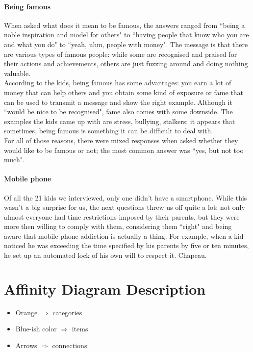 \documentclass[12pt]{scrartcl}
\begin{document}
		\paragraph{Being famous} When asked what does it mean to be famous, the answers ranged from ``being a noble inspiration and model for others" to ``having people that know who you are and what you do" to ``yeah, uhm, people with money". The message is that there are various types of famous people: while some are recognised and praised for their actions and achievements, others are just fuzzing around and doing nothing valuable.\\
		According to the kids, being famous has some advantages: you earn a lot of money that can help others and you obtain some kind of exposure or fame that can be used to transmit a message and show the right example. Although it ``would be nice to be recognised", fame also comes with some downside. The examples the kids came up with are stress, bullying, stalkers: it appears that sometimes, being famous is something it can be difficult to deal with.\\
		For all of those reasons, there were mixed responses when asked whether they would like to be famous or not; the most common answer was ``yes, but not too much".
		
		\paragraph{Mobile phone} Of all the 21 kids we interviewed, only one didn't have a smartphone. While this wasn't a big surprise for us, the next questions threw us off quite a lot: not only almost everyone had time restrictions imposed by their parents, but they were more then willing to comply with them, considering them ``right" and being aware that mobile phone addiction is actually a thing. For example, when a kid noticed he was exceeding the time specified by his parents by five or ten minutes, he set up an automated lock of his own will to respect it. Chapeau.
		

\section*{Affinity Diagram Description}
	\begin{itemize}
		\item Orange $\Rightarrow$ categories
		\item Blue-ish color $\Rightarrow$ items
		\item Arrows $\Rightarrow$ connections
	\end{itemize}
\end{document}
